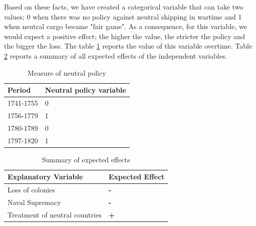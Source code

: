 \documentclass[12pt,a4paper,notitlepage,english]{article}
\begin{document}
Based on these facts, we have created a categorical variable that can take two values; 0 when there was no policy against neutral shipping in wartime and 1 when neutral cargo became "fair game". 
As a consequence, for this variable, we would expect a positive effect; the higher the value, the stricter the policy and the bigger the loss.
The table \ref{neutral_policy} reports the value of this variable overtime.
Table \ref{summary} reports a summary of all expected effects of the independent variables.


\begin{table}[H]
\centering
\caption{Measure of neutral policy}
\label{neutral_policy}
\begin{tabular}{ll}
\hline \hline
Period & Neutral policy variable  \\ \hline
1741-1755 & 0                  \\
1756-1779 & 1       \\
1780-1789 & 0                 \\
1797-1820 & 1                 \\
\hline 
\end{tabular}
\end{table}

\begin{table}[H]
\centering
\caption{Summary of expected effects}
\label{summary}
\begin{tabular}{ll}
\hline \hline
Explanatory Variable & Expected Effect  \\ \hline
Loss of colonies & \textbf{-}                  \\
Naval Supremacy & \textbf{-}                 \\
Treatment of neutral countries &       \textbf{+}      \\ \hline 
\end{tabular}
\end{table}
\end{document}
